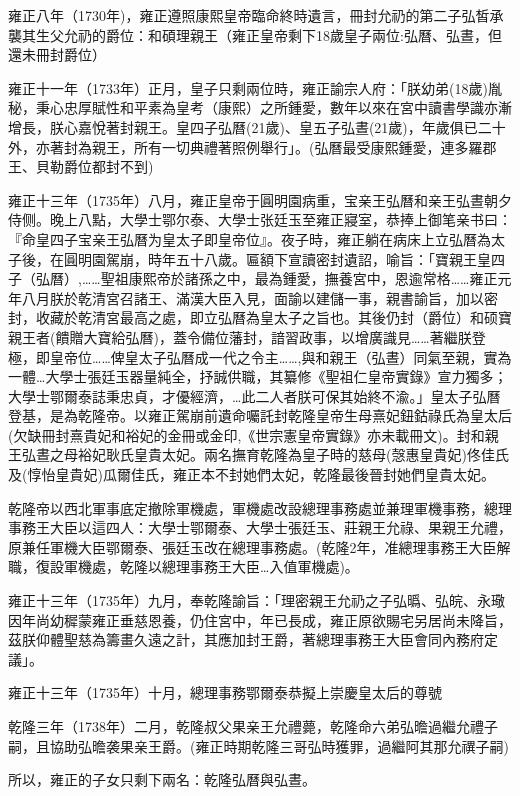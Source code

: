 雍正八年（1730年)，雍正遵照康熙皇帝臨命終時遺言，冊封允礽的第二子弘皙承襲其生父允礽的爵位：和碩理親王（雍正皇帝剩下18歲皇子兩位:弘曆、弘晝，但還未冊封爵位）

雍正十一年（1733年）正月，皇子只剩兩位時，雍正諭宗人府：「朕幼弟(18歲)胤秘，秉心忠厚賦性和平素為皇考（康熙）之所鍾愛，數年以來在宮中讀書學識亦漸增長，朕心嘉悅著封親王。皇四子弘曆(21歲)、皇五子弘晝(21歲)，年歲俱已二十外，亦著封為親王，所有一切典禮著照例舉行」。(弘曆最受康熙鍾愛，連多羅郡王、貝勒爵位都封不到)

雍正十三年（1735年）八月，雍正皇帝于圓明園病重，宝亲王弘曆和亲王弘晝朝夕侍侧。晚上八點，大學士鄂尔泰、大學士张廷玉至雍正寢室，恭捧上御笔亲书曰：『命皇四子宝亲王弘曆为皇太子即皇帝位』。夜子時，雍正躺在病床上立弘曆為太子後，在圓明園駕崩，時年五十八歲。匾額下宣讀密封遺詔，喻旨：「寶親王皇四子（弘曆）,……聖祖康熙帝於諸孫之中，最為鍾愛，撫養宮中，恩逾常格……雍正元年八月朕於乾清宮召諸王、滿漢大臣入見，面諭以建儲一事，親書諭旨，加以密封，收藏於乾清宮最高之處，即立弘曆為皇太子之旨也。其後仍封（爵位）和硕寶親王者(饋贈大寶給弘曆)，蓋令備位藩封，諳習政事，以增廣識見……著繼朕登極，即皇帝位……俾皇太子弘曆成一代之令主……,與和親王（弘晝）同氣至親，實為一體…大學士張廷玉器量純全，抒誠供職，其纂修《聖祖仁皇帝實錄》宣力獨多；大學士鄂爾泰誌秉忠貞，才優經濟，…此二人者朕可保其始終不渝。」皇太子弘曆登基，是為乾隆帝。以雍正駕崩前遺命囑託封乾隆皇帝生母熹妃鈕鈷祿氏為皇太后(欠缺冊封熹貴妃和裕妃的金冊或金印,《世宗憲皇帝實錄》亦未載冊文)。封和親王弘晝之母裕妃耿氏皇貴太妃。兩名撫育乾隆為皇子時的慈母(愨惠皇貴妃)佟佳氏及(惇怡皇貴妃)瓜爾佳氏，雍正本不封她們太妃，乾隆最後晉封她們皇貴太妃。

乾隆帝以西北軍事底定撤除軍機處，軍機處改設總理事務處並兼理軍機事務，總理事務王大臣以這四人：大學士鄂爾泰、大學士張廷玉、莊親王允祿、果親王允禮，原兼任軍機大臣鄂爾泰、張廷玉改在總理事務處。(乾隆2年，准總理事務王大臣解職，復設軍機處，乾隆以總理事務王大臣…入值軍機處)。

雍正十三年（1735年）九月，奉乾隆諭旨：「理密親王允礽之子弘㬙、弘皖、永璥因年尚幼穉蒙雍正垂慈恩養，仍住宮中，年已長成，雍正原欲賜宅另居尚未降旨，茲朕仰體聖慈為籌畫久遠之計，其應加封王爵，著總理事務王大臣會同內務府定議」。

雍正十三年（1735年）十月，總理事務鄂爾泰恭擬上崇慶皇太后的尊號

乾隆三年（1738年）二月，乾隆叔父果亲王允禮薨，乾隆命六弟弘曕過繼允禮子嗣，且協助弘曕袭果亲王爵。(雍正時期乾隆三哥弘時獲罪，過繼阿其那允禩子嗣)

所以，雍正的子女只剩下兩名：乾隆弘曆與弘晝。

